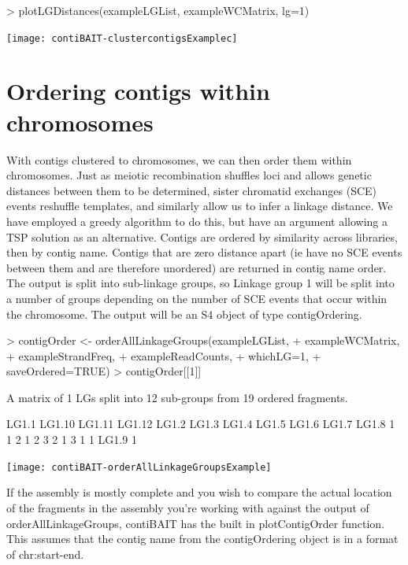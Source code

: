 \documentclass{article}
\begin{document}
\begin{Schunk}
\begin{Sinput}
> plotLGDistances(exampleLGList, exampleWCMatrix, lg=1)
\end{Sinput}
\end{Schunk}
\texttt{[image: contiBAIT-clustercontigsExamplec]}


\section{Ordering contigs within chromosomes}

With contigs clustered to chromosomes, we can then order them within chromosomes. Just as meiotic recombination shuffles loci and allows genetic distances between them to be determined, sister chromatid exchanges (SCE) events reshuffle templates, and similarly allow us to infer a linkage distance. We have employed a greedy algorithm to do this, but have an argument allowing a TSP solution as an alternative. Contigs are ordered by similarity across libraries, then by contig name. Contigs that are zero distance apart (ie have no SCE events between them and are therefore unordered) are returned in contig name order. The output is split into sub-linkage groups, so Linkage group 1 will be split into a number of groups depending on the number of SCE events that occur within the chromosome. The output will be an S4 object of type contigOrdering.

\begin{Schunk}
\begin{Sinput}
> contigOrder <- orderAllLinkageGroups(exampleLGList,
+ exampleWCMatrix,
+ exampleStrandFreq,
+ exampleReadCounts,
+ whichLG=1,
+ saveOrdered=TRUE)
> contigOrder[[1]]
\end{Sinput}
\begin{Soutput}
A matrix of 1 LGs split into 12 sub-groups from 19 ordered fragments.

 LG1.1 LG1.10 LG1.11 LG1.12  LG1.2  LG1.3  LG1.4  LG1.5  LG1.6  LG1.7  LG1.8 
     1      1      2      1      2      3      2      1      3      1      1 
 LG1.9 
     1 
\end{Soutput}
\end{Schunk}
\texttt{[image: contiBAIT-orderAllLinkageGroupsExample]}

If the assembly is mostly complete and you wish to compare the actual location of the fragments in the assembly you're working with against the output of orderAllLinkageGroups, contiBAIT has the built in plotContigOrder function. This assumes that the contig name from the contigOrdering object is in a format of chr:start-end.
\end{document}

